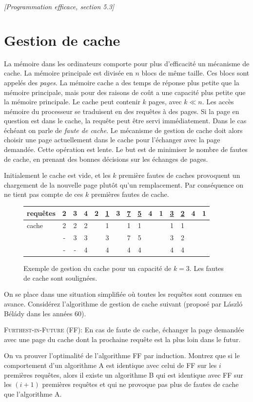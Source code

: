 \documentclass[12pt]{article}
\newcommand{\source}[1]{\begin{flushright}\emph{[#1]}\end{flushright}}
\begin{document}
\source{Programmation efficace, section 5.3}


\section{Gestion de cache}

La mémoire dans les ordinateurs comporte pour plus d'efficacité un mécanisme de cache.
La mémoire principale est divisée en $n$ blocs de même taille.  Ces blocs sont appelés des \emph{pages}.
La mémoire cache a des temps de réponse plus petite que la mémoire principale, mais pour des raisons de coût a une capacité plus petite que la mémoire principale.  Le cache peut contenir $k$ pages, avec $k \ll n$.
Les accès mémoire du processeur se traduisent en des requêtes à des pages. Si la page en question est dans le cache, la requête peut être servi immédiatement. Dans le cas échéant on parle de \emph{faute de cache}. Le mécanisme de gestion de cache doit alors choisir une page actuellement dans le cache pour l'échanger avec la page demandée.  Cette opération est lente.  Le but est de minimiser le nombre de fautes de cache, en prenant des bonnes décisions sur les échanges de pages.

Initialement le cache est vide, et les $k$ première fautes de caches provoquent un chargement de la nouvelle page plutôt qu'un remplacement.  Par conséquence on ne tient pas compte de ces $k$ premières fautes de cache.


\begin{figure}[hp]
\begin{center}
\begin{tabular}{l||*{14}c}
requêtes &
2 & 3 & 4 & 2 & \underline{1} & 3 & \underline{7} & \underline{5} & 4 & 1 & \underline{3} & \underline{2} & 4 & 1
\\ \hline
cache
& 2 & 2 & 2 & & 1 & & 1 & 1 & & & 1 & 1 \\
& - & 3 & 3 & & 3 & & 7 & 5 & & & 3 & 2 \\
& - & - & 4 & & 4 & & 4 & 4 & & & 4 & 4 \\
\end{tabular}
\end{center}
\caption{Exemple de gestion du cache pour un capacité de $k=3$. Les fautes de cache sont soulignées.}
\end{figure}

On se place dans une situation simplifiée où toutes les requêtes sont connues en avance.
Considérez l'algorithme de gestion de cache suivant (proposé par László Bélády dans les années 60).

\begin{framed}
    \textsc{Furthest-in-Future} (FF): En cas de faute de cache, échanger la page demandée avec une page du cache dont la prochaine requête est la plus loin dans le futur.
\end{framed}

On va prouver l'optimalité de l'algorithme FF par induction.
Montrez que si le comportement d'un algorithme A est identique avec celui de FF sur les $i$ premières requêtes, alors il existe un algorithme B qui est identique avec FF sur les $(i+1)$ premières requêtes et qui ne provoque pas plus de fautes de cache que l'algorithme A.
\end{document}
